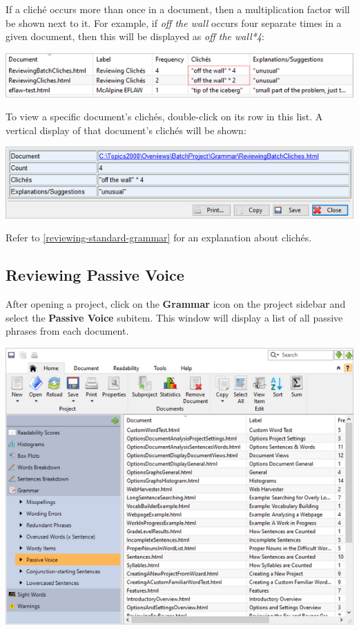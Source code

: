 \documentclass[
]{book}
\theoremstyle{definition}
\theoremstyle{definition}
\theoremstyle{definition}
\theoremstyle{definition}
\theoremstyle{remark}
\begin{document}
If a cliché occurs more than once in a document, then a multiplication factor will be shown next to it. For example, if \emph{off the wall} occurs four separate times in a given document, then this will be displayed as \emph{off the wall*4}:

\includegraphics{Images/batchclichemultiple.png}

To view a specific document's clichés, double-click on its row in this list. A vertical display of that document's clichés will be shown:

\begin{center}\includegraphics[width=0.75\linewidth,]{Images/batchclichesviewitem} \end{center}

Refer to \ref{reviewing-standard-grammar} for an explanation about clichés.

\hypertarget{reviewing-batch-passive-voices}{%
\subsection*{Reviewing Passive Voice}\label{reviewing-batch-passive-voices}}

After opening a project, click on the \textbf{Grammar} icon on the project sidebar and select the \textbf{Passive Voice} subitem. This window will display a list of all passive phrases from each document.

\includegraphics{Images/batchpassivevoice.png}
\end{document}

